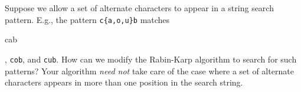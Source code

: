 Suppose we allow a set of alternate characters to appear in a string
search pattern.  E.g., the pattern {\tt c\{a,o,u\}b} matches {\tt

cab}, {\tt cob}, and {\tt cub}.  How can we modify the Rabin-Karp
algorithm to search for such patterns? Your algorithm {\em need not}
take care of the case where a set of alternate characters appears in
more than one position in the search string.
